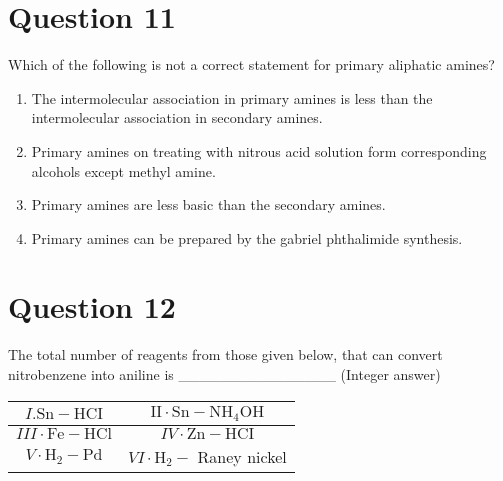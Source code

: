 \documentclass{article}
\begin{document}
\section*{Question 11}
Which of the following is not a correct statement for primary aliphatic amines? 
\begin{enumerate}[label=(\alph*)]
\item The intermolecular association in primary amines is less than the intermolecular association in secondary amines.
\item Primary amines on treating with nitrous acid solution form corresponding alcohols except methyl amine.
\item Primary amines are less basic than the secondary amines.
\item Primary amines can be prepared by the gabriel phthalimide synthesis.
\end{enumerate}
\newpage
\section*{Question 12}
The total number of reagents from those given below, that can convert nitrobenzene into aniline is _______________ (Integer answer)\setlength{\arrayrulewidth}{0.8mm}
\begin{tabular}{|c|c|}
\hline
\(I . \mathrm{Sn}-\mathrm{HCI}\) & \(\mathrm{II} \cdot \mathrm{Sn}-\mathrm{NH}_4 \mathrm{OH}\) \\
\hline
\(I I I \cdot \mathrm{Fe}-\mathrm{HCl}\) & \(I V \cdot \mathrm{Zn}-\mathrm{HCI}\) \\
\hline
\(V \cdot \mathrm{H}_2-\mathrm{Pd}\) & \(V I \cdot \mathrm{H}_2-\) Raney nickel \\
\hline
\end{tabular}
\setlength{\arrayrulewidth}{0.4mm}

\begin{enumerate}[label=(\alph*)]
\end{enumerate}
\newpage
\end{document}
